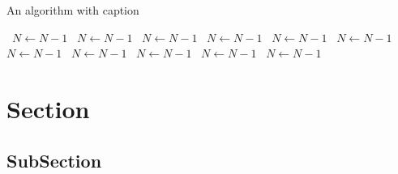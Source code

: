 \documentclass[a4paper]{article}
\begin{document}
\begin{algorithm}
\caption{An algorithm with caption}
\begin{algorithmic}
\    \State $N \gets N - 1$
\    \State $N \gets N - 1$
\    \State $N \gets N - 1$
\    \State $N \gets N - 1$
\    \State $N \gets N - 1$
\    \State $N \gets N - 1$
\    \State $N \gets N - 1$
\    \State $N \gets N - 1$
\    \State $N \gets N - 1$
\    \State $N \gets N - 1$
\    \State $N \gets N - 1$
\EndWhile
\end{algorithmic}
\end{algorithm}

\section{Section}

\subsection{SubSection}
\end{document}
